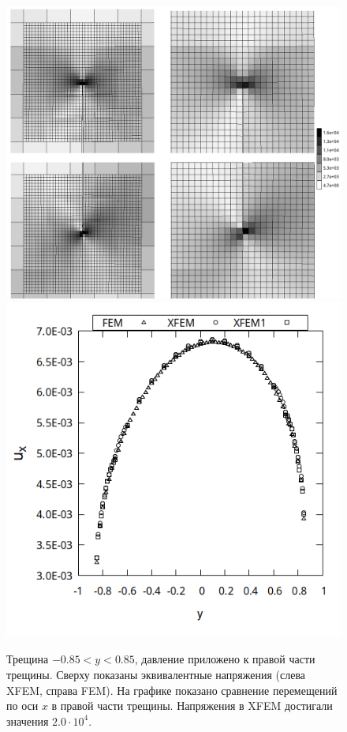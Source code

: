 \begin{figure}[h!]
	\includegraphics[height=0.4\textheight]{pictures/bc2_0.85_top_bot}
	\includegraphics[height=0.4\textheight]{pictures/bc2_0.85_ux}
	\caption{ Трещина $-0.85<y<0.85$, давление приложено к правой части трещины. Сверху показаны эквивалентные напряжения (слева XFEM, справа FEM). На графике показано сравнение перемещений по оси $x$ в правой части трещины. Напряжения в XFEM достигали значения $2.0\cdot 10^{4}$.
	}
	\label{fig:res3}
\end{figure}

